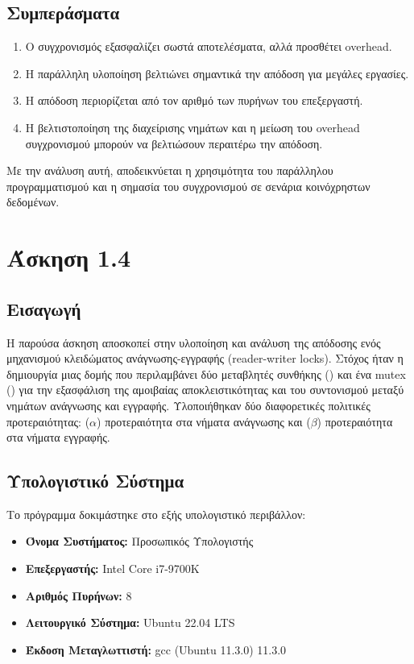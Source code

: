 \documentclass{article}
\begin{document}
\subsection*{Συμπεράσματα}
\begin{enumerate}
    \item Ο συγχρονισμός εξασφαλίζει σωστά αποτελέσματα, αλλά προσθέτει overhead.
    \item Η παράλληλη υλοποίηση βελτιώνει σημαντικά την απόδοση για μεγάλες εργασίες.
    \item Η απόδοση περιορίζεται από τον αριθμό των πυρήνων του επεξεργαστή.
    \item Η βελτιστοποίηση της διαχείρισης νημάτων και η μείωση του overhead συγχρονισμού μπορούν να βελτιώσουν περαιτέρω την απόδοση.
\end{enumerate}
Με την ανάλυση αυτή, αποδεικνύεται η χρησιμότητα του παράλληλου προγραμματισμού και η σημασία του συγχρονισμού σε σενάρια κοινόχρηστων δεδομένων.
\section*{Άσκηση 1.4}
\subsection*{Εισαγωγή}
Η παρούσα άσκηση αποσκοπεί στην υλοποίηση και ανάλυση της απόδοσης ενός μηχανισμού κλειδώματος ανάγνωσης-εγγραφής (reader-writer locks). 
Στόχος ήταν η δημιουργία μιας δομής που περιλαμβάνει δύο μεταβλητές συνθήκης () και ένα mutex () για την εξασφάλιση της αμοιβαίας αποκλειστικότητας και του συντονισμού μεταξύ νημάτων ανάγνωσης και εγγραφής. Υλοποιήθηκαν δύο διαφορετικές πολιτικές προτεραιότητας: 
($\alpha$) προτεραιότητα στα νήματα ανάγνωσης και ($\beta$) προτεραιότητα στα νήματα εγγραφής.
\subsection*{Υπολογιστικό Σύστημα} Το πρόγραμμα δοκιμάστηκε στο εξής υπολογιστικό περιβάλλον: \begin{itemize} \item \textbf{Όνομα Συστήματος:} Προσωπικός Υπολογιστής \item \textbf{Επεξεργαστής:} Intel Core i7-9700K \item \textbf{Αριθμός Πυρήνων:} 8 \item \textbf{Λειτουργικό Σύστημα:} Ubuntu 22.04 LTS \item \textbf{Έκδοση Μεταγλωττιστή:} gcc (Ubuntu 11.3.0) 11.3.0 \end{itemize}
\end{document}
